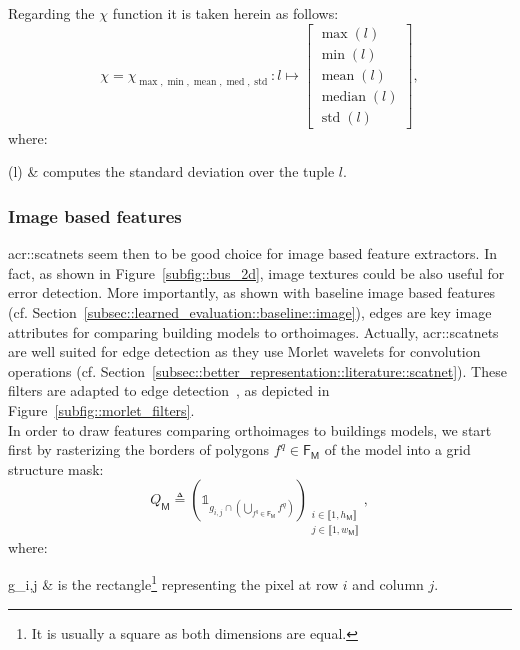            Regarding the \(\chi\) function it is taken herein as follows:
            \begin{equation}
                \label{eq::max_min_mean_med_std_extractor}
                \chi = \chi_{\max,\min,\operatorname{mean},\operatorname{med},\operatorname{std}}: l \mapsto \begin{bmatrix}
                    \max(l)\\
                    \min(l)\\
                    \operatorname{mean}(l)\\
                    \operatorname{median}(l)\\
                    \operatorname{std}(l)
                \end{bmatrix},
            \end{equation}
            where:
            \begin{conditions}
                (l) & computes the standard deviation over the tuple \(l\).
            \end{conditions}

        \subsubsection{Image based features}
            \glspl{acr::scatnet} seem then to be good choice for image based feature extractors.
            In fact, as shown in Figure~\ref{subfig::bus_2d}, image textures could be also useful for error detection.
            More importantly, as shown with baseline image based features (cf. Section~\ref{subsec::learned_evaluation::baseline::image}), edges are key image attributes for comparing building models to orthoimages.
            Actually, \glspl{acr::scatnet} are well suited for edge detection as they use Morlet wavelets for convolution operations (cf. Section~\ref{subsec::better_representation::literature::scatnet}).
            These filters are adapted to edge detection~\parencite{zhang2007radon}, as depicted in Figure~\ref{subfig::morlet_filters}.\\

            In order to draw features comparing orthoimages to buildings models, we start first by rasterizing the borders of polygons \(f^q \in \mathsf{F_M}\) of the model into a grid structure mask:
            \begin{equation}
                \label{eq::borders_mask}
                Q_{\mathsf{M}} \triangleq \left(\mathbb{1}_{g_{i,j} \cap \left(\bigcup_{f^q \in \mathsf{F_M}}f^q\right)}\right)_{\substack{i \in \llbracket 1, h_\mathsf{M} \rrbracket\\j \in \llbracket 1, w_\mathsf{M} \rrbracket}},
            \end{equation}
            where:
            \begin{conditions}
                g_{i,j} & is the rectangle\footnote{It is usually a square as both dimensions are equal.} representing the pixel at row \(i\) and column \(j\).
            \end{conditions}

